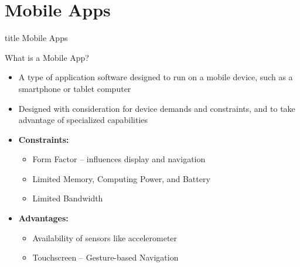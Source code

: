 \documentclass[aspectratio=169, xcolor=dvipsnames]{beamer}
\begin{document}
\section{Mobile Apps}
\begin{frame}
  \vfill
  \centering
  \begin{beamercolorbox}[sep=8pt,center,shadow=true,rounded=true]{title}
    Mobile Apps\par%
  \end{beamercolorbox}
  \vfill
\end{frame}

\begin{frame}{What is a Mobile App?}
    \begin{itemize}[<+->]
        \item A type of application software designed to run on a mobile device, such as a smartphone or tablet computer
        \item Designed with consideration for device demands and constraints, and to take advantage of specialized capabilities
        \item \textbf{Constraints:}
        \begin{itemize}
            \item[$\triangleright$] Form Factor -- influences display and navigation
            \item[$\triangleright$] Limited Memory, Computing Power, and Battery
            \item[$\triangleright$] Limited Bandwidth
        \end{itemize}
        \item \textbf{Advantages:}
        \begin{itemize}
            \item[$\triangleright$] Availability of sensors like accelerometer
            \item[$\triangleright$] Touchscreen -- Gesture-based Navigation
        \end{itemize}
    \end{itemize}
\end{frame}
\end{document}

